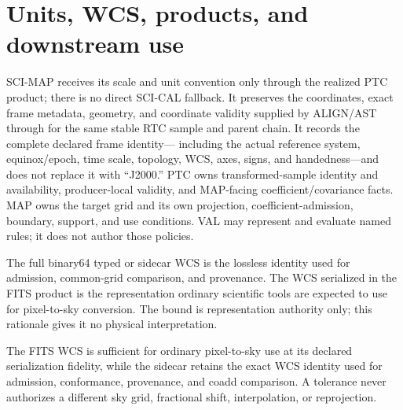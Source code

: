 \documentclass[10pt]{article}
\begin{document}
\clearpage
\section{Units, WCS, products, and downstream use}\label{sec:products}
SCI-MAP receives its scale and unit convention only through the realized PTC
product; there is no direct SCI-CAL fallback. It preserves the coordinates,
exact frame metadata, geometry, and coordinate validity supplied by ALIGN/AST
through \SCIMapASTRTCGridProfile{} for the same stable RTC
sample and parent chain. It records the complete declared frame identity---
including the actual reference system, equinox/epoch, time scale, topology,
WCS, axes, signs, and handedness---and does not replace it with ``J2000.'' PTC
owns transformed-sample identity and availability, producer-local validity,
and MAP-facing coefficient/covariance facts. MAP owns the target grid and its
own projection, coefficient-admission, boundary, support, and use conditions.
VAL may represent and evaluate named rules; it does not author those policies.

The full binary64 typed or sidecar WCS is the lossless identity used
for admission, common-grid comparison, and provenance. The WCS serialized in
the FITS product is the representation ordinary scientific tools are expected
to use for pixel-to-sky conversion. \SCIMapWCSComparisonDefinition{} The bound
is representation authority only; this rationale gives it no physical
interpretation.

The FITS WCS is sufficient for ordinary pixel-to-sky use at its declared
serialization fidelity, while the sidecar retains the exact WCS identity used
for admission, conformance, provenance, and coadd comparison. A tolerance
never authorizes a different sky grid, fractional shift, interpolation, or
reprojection.
\end{document}
